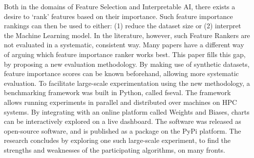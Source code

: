 \documentclass[../main.tex]{subfiles}
\begin{document}
Both in the domains of Feature Selection and Interpretable AI, there exists a desire to `rank' features based on their importance. Such feature importance rankings can then be used to either: (1) reduce the dataset size or (2) interpret the Machine Learning model. In the literature, however, such Feature Rankers are not evaluated in a systematic, consistent way. Many papers have a different way of arguing which feature importance ranker works best. This paper fills this gap, by proposing a new evaluation methodology. By making use of synthetic datasets, feature importance scores can be known beforehand, allowing more systematic evaluation. To facilitate large-scale experimentation using the new methodology, a benchmarking framework was built in Python, called fseval. The framework allows running experiments in parallel and distributed over machines on HPC systems. By integrating with an online platform called Weights and Biases, charts can be interactively explored on a live dashboard. The software was released as open-source software, and is published as a package on the PyPi platform. The research concludes by exploring one such large-scale experiment, to find the strengths and weaknesses of the participating algorithms, on many fronts.

\biblio
\end{document}
